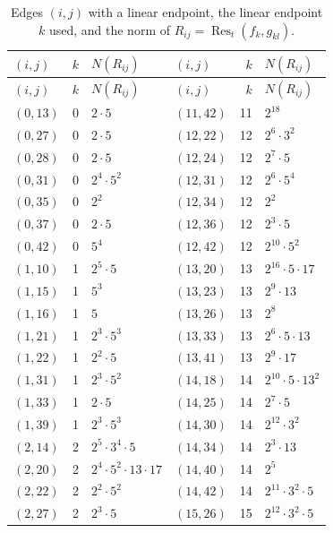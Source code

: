 \documentclass[11pt]{article}
\begin{document}
\begingroup\small
\setlength{\LTcapwidth}{\textwidth}
\begin{longtable}{@{}lrl@{\qquad}lrl@{}}
\caption{Edges $(i,j)$ with a linear endpoint, the linear endpoint $k$ used, and the norm of $R_{ij}=\operatorname{Res}_t(f_k,g_{kl})$.}\label{tab:sep}\\
\hline $(i,j)$ & $k$ & $N(R_{ij})$ & $(i,j)$ & $k$ & $N(R_{ij})$\\\hline\endfirsthead\hline $(i,j)$ & $k$ & $N(R_{ij})$ & $(i,j)$ & $k$ & $N(R_{ij})$\\\hline\endhead\hline\endfoot
$(0,13)$ & 0 & $2\cdot 5$ & $(11,42)$ & 11 & $2^{18}$\\
$(0,27)$ & 0 & $2\cdot 5$ & $(12,22)$ & 12 & $2^{6}\cdot 3^{2}$\\
$(0,28)$ & 0 & $2\cdot 5$ & $(12,24)$ & 12 & $2^{7}\cdot 5$\\
$(0,31)$ & 0 & $2^{4}\cdot 5^{2}$ & $(12,31)$ & 12 & $2^{6}\cdot 5^{4}$\\
$(0,35)$ & 0 & $2^{2}$ & $(12,34)$ & 12 & $2^{2}$\\
$(0,37)$ & 0 & $2\cdot 5$ & $(12,36)$ & 12 & $2^{3}\cdot 5$\\
$(0,42)$ & 0 & $5^{4}$ & $(12,42)$ & 12 & $2^{10}\cdot 5^{2}$\\
$(1,10)$ & 1 & $2^{5}\cdot 5$ & $(13,20)$ & 13 & $2^{16}\cdot 5\cdot 17$\\
$(1,15)$ & 1 & $5^{3}$ & $(13,23)$ & 13 & $2^{9}\cdot 13$\\
$(1,16)$ & 1 & $5$ & $(13,26)$ & 13 & $2^{8}$\\
$(1,21)$ & 1 & $2^{3}\cdot 5^{3}$ & $(13,33)$ & 13 & $2^{6}\cdot 5\cdot 13$\\
$(1,22)$ & 1 & $2^{2}\cdot 5$ & $(13,41)$ & 13 & $2^{9}\cdot 17$\\
$(1,31)$ & 1 & $2^{3}\cdot 5^{2}$ & $(14,18)$ & 14 & $2^{10}\cdot 5\cdot 13^{2}$\\
$(1,33)$ & 1 & $2\cdot 5$ & $(14,25)$ & 14 & $2^{7}\cdot 5$\\
$(1,39)$ & 1 & $2^{3}\cdot 5^{3}$ & $(14,30)$ & 14 & $2^{12}\cdot 3^{2}$\\
$(2,14)$ & 2 & $2^{5}\cdot 3^{4}\cdot 5$ & $(14,34)$ & 14 & $2^{3}\cdot 13$\\
$(2,20)$ & 2 & $2^{4}\cdot 5^{2}\cdot 13\cdot 17$ & $(14,40)$ & 14 & $2^{5}$\\
$(2,22)$ & 2 & $2^{2}\cdot 5^{2}$ & $(14,42)$ & 14 & $2^{11}\cdot 3^{2}\cdot 5$\\
$(2,27)$ & 2 & $2^{3}\cdot 5$ & $(15,26)$ & 15 & $2^{12}\cdot 3^{2}\cdot 5$\\

\end{longtable}
\end{document}
